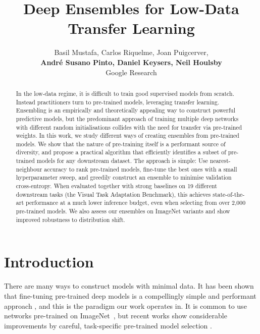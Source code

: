 \documentclass{article} \usepackage{iclr2021_conference,times}
\title{Deep Ensembles for Low-Data\\ Transfer Learning}
\author{Basil Mustafa,  Carlos Riquelme,  Joan Puigcerver, \\
  \textbf{Andr\'e Susano Pinto,  Daniel Keysers,  Neil Houlsby} \\
  
  Google Research 

}
\begin{document}
\maketitle

\begin{abstract}
In the low-data regime, it is difficult to train good supervised models from scratch. Instead practitioners turn to pre-trained models, leveraging transfer learning.
Ensembling is an empirically and theoretically appealing way to construct powerful predictive models, but the predominant approach of training multiple deep networks with different random initialisations collides with the need for transfer via pre-trained weights.
In this work, we study different ways of creating ensembles from pre-trained models. We show that the nature of pre-training itself is a performant source of diversity, and propose a practical algorithm that efficiently identifies a subset of pre-trained models for any downstream dataset.
The approach is simple: Use nearest-neighbour accuracy to rank pre-trained models, fine-tune the best ones with a small hyperparameter sweep, and greedily construct an ensemble to minimise validation cross-entropy.
When evaluated together with strong baselines on 19 different downstream tasks (the Visual Task Adaptation Benchmark), this achieves state-of-the-art performance at a much lower inference budget, even when selecting from over 2,000 pre-trained models.
We also assess our ensembles on ImageNet variants and show improved robustness to distribution shift.

\end{abstract} \section{Introduction}
There are many ways to construct models with minimal data. It has been shown that fine-tuning pre-trained deep models is a compellingly simple and performant approach \citep{dhillon2019baseline, alex2019big}, and this is the paradigm our work operates in.
It is common to use networks pre-trained on ImageNet~\citep{deng2009imagenet}, but 
recent works show considerable improvements by careful, task-specific pre-trained model selection \citep{ngiam2018domain,puigcerver2020experts}.
\end{document}
